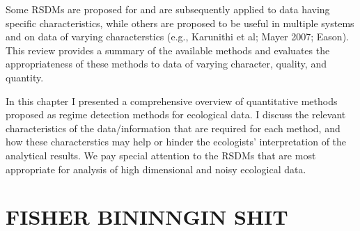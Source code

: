\documentclass[12pt,twoside,openany]{reedthesis}
\begin{document}
Some RSDMs are proposed for and are subsequently applied to data having specific characteristics, while others are proposed to be useful in multiple systems and on data of varying characterstics (e.g., Karunithi et al; Mayer 2007; Eason). This review provides a summary of the available methods and evaluates the appropriateness of these methods to data of varying character, quality, and quantity.

In this chapter I presented a comprehensive overview of quantitative methods proposed as regime detection methods for ecological data. I discuss the relevant characteristics of the data/information that are required for each method, and how these characterstics may help or hinder the ecologists' interpretation of the analytical results. We pay special attention to the RSDMs that are most appropriate for analysis of high dimensional and noisy ecological data.

\hypertarget{fisher-bininngin-shit}{%
\section{FISHER BININNGIN SHIT}\label{fisher-bininngin-shit}}
\end{document}

